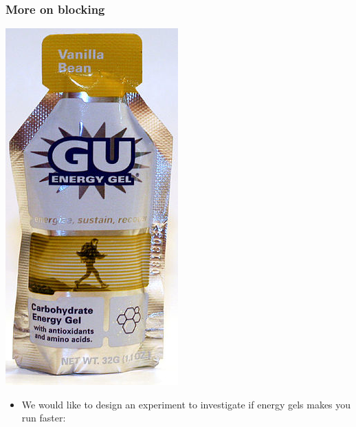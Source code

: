 \begin{frame}
\frametitle{More on blocking}


{
\begin{center}
\includegraphics[width=\textwidth]{1-4_experiments/figures/gu}
\end{center}
}
{
\begin{itemize}
\item We would like to design an experiment to investigate if energy gels makes you run faster:


\end{itemize}}
\end{frame}
